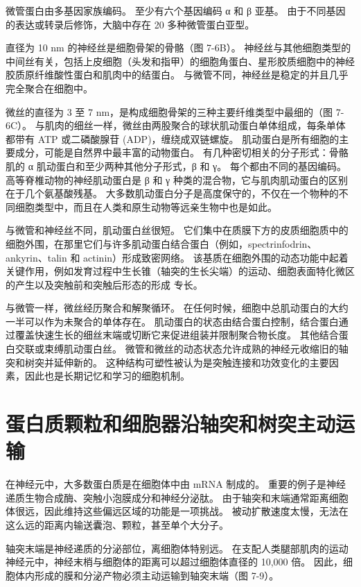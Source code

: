 微管蛋白由多基因家族编码。 
至少有六个基因编码 α 和 β 亚基。 
由于不同基因的表达或转录后修饰，大脑中存在 20 多种微管蛋白亚型。


直径为 10 nm 的神经丝是细胞骨架的骨骼（图 7-6B）。 
神经丝与其他细胞类型的中间丝有关，包括上皮细胞（头发和指甲）的细胞角蛋白、星形胶质细胞中的神经胶质原纤维酸性蛋白和肌肉中的结蛋白。 
与微管不同，神经丝是稳定的并且几乎完全聚合在细胞中。


微丝的直径为 3 至 7 nm，是构成细胞骨架的三种主要纤维类型中最细的（图 7-6C）。 
与肌肉的细丝一样，微丝由两股聚合的球状肌动蛋白单体组成，每条单体都带有 ATP 或二磷酸腺苷 (ADP)，缠绕成双链螺旋。 
肌动蛋白是所有细胞的主要成分，可能是自然界中最丰富的动物蛋白。 
有几种密切相关的分子形式：骨骼肌的 α 肌动蛋白和至少两种其他分子形式，β 和 γ。 
每个都由不同的基因编码。 
高等脊椎动物的神经肌动蛋白是 β 和 γ 种类的混合物，它与肌肉肌动蛋白的区别在于几个氨基酸残基。 
大多数肌动蛋白分子是高度保守的，不仅在一个物种的不同细胞类型中，而且在人类和原生动物等远亲生物中也是如此。


与微管和神经丝不同，肌动蛋白丝很短。 
它们集中在质膜下方的皮质细胞质中的细胞外围，在那里它们与许多肌动蛋白结合蛋白（例如，spectrinfodrin、ankyrin、talin 和 actinin）形成致密网络。 
该基质在细胞外围的动态功能中起着关键作用，例如发育过程中生长锥（轴突的生长尖端）的运动、细胞表面特化微区的产生以及突触前和突触后形态的形成 专长。


与微管一样，微丝经历聚合和解聚循环。 
在任何时候，细胞中总肌动蛋白的大约一半可以作为未聚合的单体存在。 
肌动蛋白的状态由结合蛋白控制，结合蛋白通过覆盖快速生长的细丝末端或切断它来促进组装并限制聚合物长度。 
其他结合蛋白交联或束缚肌动蛋白丝。 
微管和微丝的动态状态允许成熟的神经元收缩旧的轴突和树突并延伸新的。
这种结构可塑性被认为是突触连接和功效变化的主要因素，因此也是长期记忆和学习的细胞机制。



\section{蛋白质颗粒和细胞器沿轴突和树突主动运输}
在神经元中，大多数蛋白质是在细胞体中由 mRNA 制成的。 重要的例子是神经递质生物合成酶、突触小泡膜成分和神经分泌肽。 由于轴突和末端通常距离细胞体很远，因此维持这些偏远区域的功能是一项挑战。 被动扩散速度太慢，无法在这么远的距离内输送囊泡、颗粒，甚至单个大分子。

轴突末端是神经递质的分泌部位，离细胞体特别远。 在支配人类腿部肌肉的运动神经元中，神经末梢与细胞体的距离可以超过细胞体直径的 10,000 倍。 因此，细胞体内形成的膜和分泌产物必须主动运输到轴突末端（图 7-9）。


